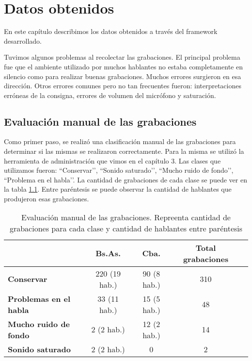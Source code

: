 \chapter{Datos obtenidos}

En este capítulo describimos los datos obtenidos a través del framework desarrollado. 

Tuvimos algunos problemas al recolectar las grabaciones. El principal problema fue que el ambiente utilizado por muchos hablantes no estaba completamente en silencio como para realizar buenas grabaciones. Muchos errores surgieron en esa dirección. Otros errores comunes pero no tan frecuentes fueron: interpretaciones erróneas de la consigna, errores de volumen del micrófono y saturación. 

\section{Evaluación manual de las grabaciones}

Como primer paso, se realizó una clasificación manual de las grabaciones para determinar si las mismas se realizaron correctamente. Para la misma se utilizó la herramienta de administración que vimos en el capítulo 3. Las clases que utilizamos fueron: ``Conservar’’, ``Sonido saturado’’, ``Mucho ruido de fondo’’, ``Problema en el habla’’. La cantidad de grabaciones de cada clase se puede ver en la tabla \ref{eva_table}. Entre paréntesis se puede observar la cantidad de hablantes que produjeron esas grabaciones.

\begin{table}[h]
\centering
\begin{tabular}{|l|c|c|c|c|}
\hline
\textbf{}  & \textbf{Bs.As. } & \textbf{Cba.} & \textbf{Total grabaciones} \\ \hline
\textbf{Conservar}  & 220 (19 hab.) & 90 (8 hab.) & 310 \\ \hline
\textbf{Problemas en el habla}  & 33 (11 hab.) & 15 (5 hab.) & 48 \\ \hline
\textbf{Mucho ruido de fondo}  & 2 (2 hab.) & 12 (2 hab.) & 14 \\ \hline
\textbf{Sonido saturado}  & 2 (2 hab.) & 0 & 2 \\ \hline
\end{tabular}
\caption{Evaluación manual de las grabaciones. Repreenta cantidad de grabaciones para cada clase y cantidad de hablantes entre paréntesis}
\label{eva_table}
\end{table}

